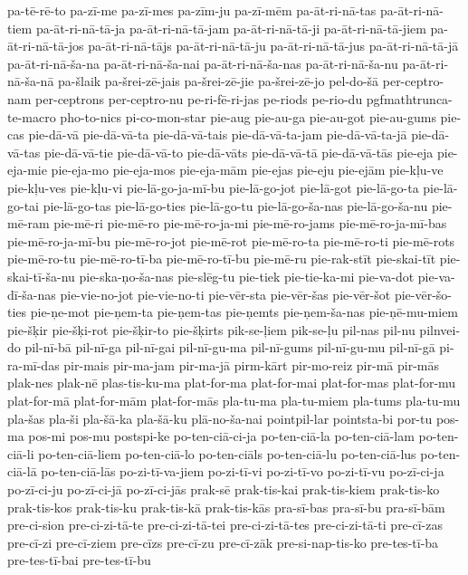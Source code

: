 {pa-tē-rē-to
pa-zī-me
pa-zī-mes
pa-zīm-ju
pa-zī-mēm
pa-āt-ri-nā-tas
pa-āt-ri-nā-tiem
pa-āt-ri-nā-tā-ja
pa-āt-ri-nā-tā-jam
pa-āt-ri-nā-tā-ji
pa-āt-ri-nā-tā-jiem
pa-āt-ri-nā-tā-jos
pa-āt-ri-nā-tājs
pa-āt-ri-nā-tā-ju
pa-āt-ri-nā-tā-jus
pa-āt-ri-nā-tā-jā
pa-āt-ri-nā-ša-na
pa-āt-ri-nā-ša-nai
pa-āt-ri-nā-ša-nas
pa-āt-ri-nā-ša-nu
pa-āt-ri-nā-ša-nā
pa-šlaik
pa-šrei-zē-jais
pa-šrei-zē-jie
pa-šrei-zē-jo
pel-do-šā
per-ceptro-nam
per-ceptrons
per-ceptro-nu
pe-ri-fē-ri-jas
pe-riods
pe-rio-du
pgfmathtrunca-te-macro
pho-to-nics
pi-co-mon-star
pie-aug
pie-au-ga
pie-au-got
pie-au-gums
pie-cas
pie-dā-vā
pie-dā-vā-ta
pie-dā-vā-tais
pie-dā-vā-ta-jam
pie-dā-vā-ta-jā
pie-dā-vā-tas
pie-dā-vā-tie
pie-dā-vā-to
pie-dā-vāts
pie-dā-vā-tā
pie-dā-vā-tās
pie-eja
pie-eja-mie
pie-eja-mo
pie-eja-mos
pie-eja-mām
pie-ejas
pie-eju
pie-ejām
pie-kļu-ve
pie-kļu-ves
pie-kļu-vi
pie-lā-go-ja-mī-bu
pie-lā-go-jot
pie-lā-got
pie-lā-go-ta
pie-lā-go-tai
pie-lā-go-tas
pie-lā-go-ties
pie-lā-go-tu
pie-lā-go-ša-nas
pie-lā-go-ša-nu
pie-mē-ram
pie-mē-ri
pie-mē-ro
pie-mē-ro-ja-mi
pie-mē-ro-jams
pie-mē-ro-ja-mī-bas
pie-mē-ro-ja-mī-bu
pie-mē-ro-jot
pie-mē-rot
pie-mē-ro-ta
pie-mē-ro-ti
pie-mē-rots
pie-mē-ro-tu
pie-mē-ro-tī-ba
pie-mē-ro-tī-bu
pie-mē-ru
pie-rak-stīt
pie-skai-tīt
pie-skai-tī-ša-nu
pie-ska-ņo-ša-nas
pie-slēg-tu
pie-tiek
pie-tie-ka-mi
pie-va-dot
pie-va-dī-ša-nas
pie-vie-no-jot
pie-vie-no-ti
pie-vēr-sta
pie-vēr-šas
pie-vēr-šot
pie-vēr-šo-ties
pie-ņe-mot
pie-ņem-ta
pie-ņem-tas
pie-ņemts
pie-ņem-ša-nas
pie-ņē-mu-miem
pie-šķir
pie-šķi-rot
pie-šķir-to
pie-šķirts
pik-se-ļiem
pik-se-ļu
pil-nas
pil-nu
pilnvei-do
pil-nī-bā
pil-nī-ga
pil-nī-gai
pil-nī-gu-ma
pil-nī-gums
pil-nī-gu-mu
pil-nī-gā
pi-ra-mī-das
pir-mais
pir-ma-jam
pir-ma-jā
pirm-kārt
pir-mo-reiz
pir-mā
pir-mās
plak-nes
plak-nē
plas-tis-ku-ma
plat-for-ma
plat-for-mai
plat-for-mas
plat-for-mu
plat-for-mā
plat-for-mām
plat-for-mās
pla-tu-ma
pla-tu-miem
pla-tums
pla-tu-mu
pla-šas
pla-ši
pla-šā-ka
pla-šā-ku
plā-no-ša-nai
pointpil-lar
pointsta-bi
por-tu
pos-ma
pos-mi
pos-mu
postspi-ke
po-ten-ciā-ci-ja
po-ten-ciā-la
po-ten-ciā-lam
po-ten-ciā-li
po-ten-ciā-liem
po-ten-ciā-lo
po-ten-ciāls
po-ten-ciā-lu
po-ten-ciā-lus
po-ten-ciā-lā
po-ten-ciā-lās
po-zi-tī-va-jiem
po-zi-tī-vi
po-zi-tī-vo
po-zi-tī-vu
po-zī-ci-ja
po-zī-ci-ju
po-zī-ci-jā
po-zī-ci-jās
prak-sē
prak-tis-kai
prak-tis-kiem
prak-tis-ko
prak-tis-kos
prak-tis-ku
prak-tis-kā
prak-tis-kās
pra-sī-bas
pra-sī-bu
pra-sī-bām
pre-ci-sion
pre-ci-zi-tā-te
pre-ci-zi-tā-tei
pre-ci-zi-tā-tes
pre-ci-zi-tā-ti
pre-cī-zas
pre-cī-zi
pre-cī-ziem
pre-cīzs
pre-cī-zu
pre-cī-zāk
pre-si-nap-tis-ko
pre-tes-tī-ba
pre-tes-tī-bai
pre-tes-tī-bu
}
